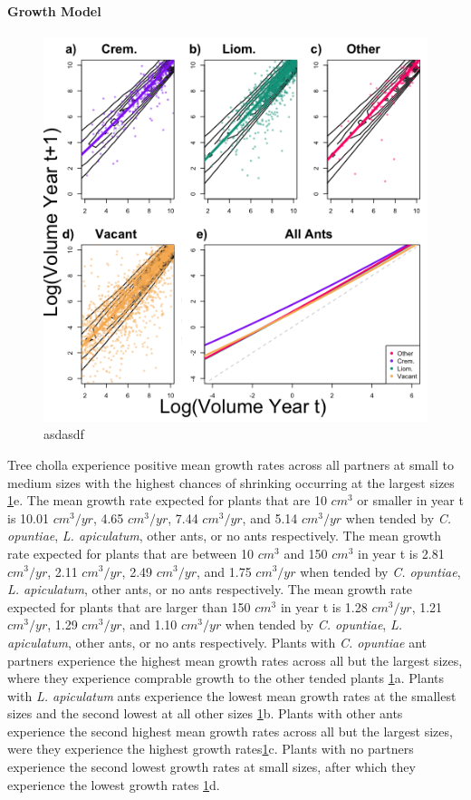 \documentclass[11pt]{article}
\begin{document}
\paragraph{Growth Model}
\begin{figure}[H]
	\includegraphics[width=0.95\linewidth]{Figures/GrowContourLinesColor.png}
	\caption{asdasdf}
	\label{fig:growth}
\end{figure}
Tree cholla experience positive mean growth rates across all partners at small to medium sizes with the highest chances of shrinking occurring at the largest sizes \ref{fig:growth}e.
The mean growth rate expected for plants that are 10 $cm^3$ or smaller in year t is 10.01 $cm^3/yr$, 4.65 $cm^3/yr$, 7.44 $cm^3/yr$, and 5.14 $cm^3/yr$ when tended by \textit{C. opuntiae}, \textit{L. apiculatum}, other ants, or no ants respectively. 
The mean growth rate expected for plants that are between 10 $cm^3$ and 150 $cm^3$ in year t is 2.81 $cm^3/yr$, 2.11 $cm^3/yr$, 2.49 $cm^3/yr$, and 1.75 $cm^3/yr$ when tended by \textit{C. opuntiae}, \textit{L. apiculatum}, other ants, or no ants respectively. 
The mean growth rate expected for plants that are larger than 150 $cm^3$ in year t is 1.28 $cm^3/yr$, 1.21 $cm^3/yr$, 1.29 $cm^3/yr$, and 1.10 $cm^3/yr$ when tended by \textit{C. opuntiae}, \textit{L. apiculatum}, other ants, or no ants respectively. 
Plants with \textit{C. opuntiae} ant partners experience the highest mean growth rates across all but the largest sizes, where they experience comprable growth to the other tended plants \ref{fig:growth}a. 
Plants with \textit{L. apiculatum} ants experience the lowest mean growth rates at the smallest sizes and the second lowest at all other sizes \ref{fig:growth}b. 
Plants with other ants experience the second highest mean growth rates across all but the largest sizes, were they experience the highest growth rates\ref{fig:growth}c.
Plants with no partners experience the second lowest growth rates at small sizes, after which they experience the lowest growth rates \ref{fig:growth}d. 
\end{document}
